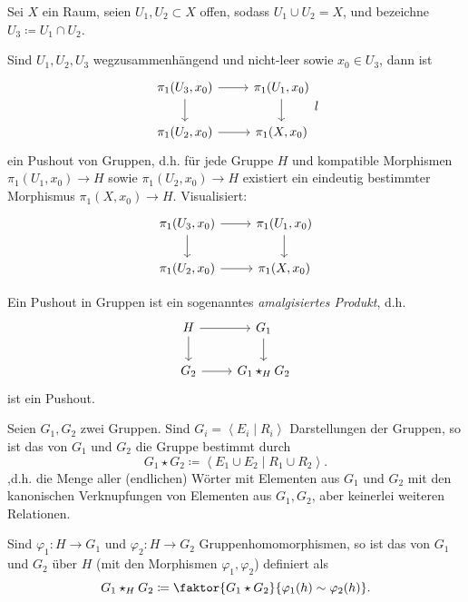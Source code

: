 \begin{theorem}\label{thm:seifert-van-kampen}
    Sei $X$ ein Raum, seien  $U_1,U_2\subset X$ offen, sodass $U_1\cup U_2 = X$, und bezeichne  $U_3 \coloneqq  U_1 \cap U_2$.

    Sind $U_1,U_2,U_3$ wegzusammenhängend und nicht-leer sowie $x_0\in U_3$, dann ist
    \[
    \begin{tikzcd}
        \pi_1(U_3,x_0) \ar[swap]{d}{} \ar{r}{} & \pi_1(U_1,x_0) \ar{d}{} \\
        \pi_1(U_2,x_0) \ar[swap]{r}{} & \pi_1(X,x_0)
    \end{tikzcd}
    l\]
    ein Pushout von Gruppen, d.h. für jede Gruppe $H$ und kompatible Morphismen  $\pi_1(U_1,x_0) \to  H$ sowie $\pi_1(U_2,x_0) \to  H$ existiert ein eindeutig bestimmter Morphismus $\pi_1(X,x_0) \to  H$. Visualisiert:
    \[
    \begin{tikzcd}
        \pi_1(U_3,x_0) \ar[swap]{d}{} \ar{r}{} & \pi_1(U_1,x_0) \ar{d}{} \\
        \pi_1(U_2,x_0) \ar[swap]{r}{} & \pi_1(X,x_0)
    \end{tikzcd}
    \]
\end{theorem}

\begin{remark}
    Ein Pushout in Gruppen ist ein sogenanntes \textit{amalgisiertes Produkt}, d.h.
    \[
    \begin{tikzcd}
        H \ar[swap]{d}{} \ar{r}{} & G_1 \ar{d}{} \\
        G_2 \ar[swap]{r}{} & G_1 \star_H G_2
    \end{tikzcd}
    \]
    ist ein Pushout.
\end{remark}

\begin{ddefinition}
    Seien $G_1,G_2$ zwei Gruppen. Sind $G_i = \left< E_i \mid  R_i \right> $ Darstellungen der Gruppen, so ist das  von $G_1$ und $G_2$ die Gruppe bestimmt durch
    \[
G_1 \star G_2 \coloneqq      \left< E_1 \cup E_2\mid R_1 \cup R_2 \right> 
    .\] 
    ,d.h. die Menge aller (endlichen) Wörter mit Elementen aus $G_1$ und $G_2$ mit den kanonischen Verknupfungen von Elementen aus $G_1,G_2$, aber keinerlei weiteren Relationen.

    Sind $\varphi_1\colon H \to  G_1$ und $\varphi_2\colon H\to G_2$ Gruppenhomomorphismen, so ist das  von $G_1$ und $G_2$ über $H$ (mit den Morphismen  $\varphi_1,\varphi_2$) definiert als
\[
    G_1\star_H G_2 \coloneqq  \faktor{G_1 \star G_2}{\varphi_1(h) \sim  \varphi_2(h)}
.\] 
\end{ddefinition}

